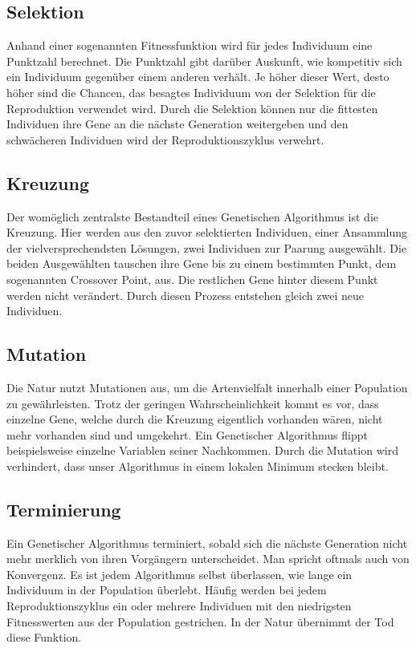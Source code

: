 \subsection{Selektion}
Anhand einer sogenannten Fitnessfunktion wird für jedes Individuum eine Punktzahl berechnet.
Die Punktzahl gibt darüber Auskunft, wie kompetitiv sich ein Individuum gegenüber einem anderen
verhält. Je höher dieser Wert, desto höher sind die Chancen, das besagtes Individuum von der
Selektion für die Reproduktion verwendet wird. Durch die Selektion können nur die fittesten
Individuen ihre Gene an die nächste Generation weitergeben und den schwächeren Individuen wird
der Reproduktionszyklus verwehrt.

\subsection{Kreuzung}
Der womöglich zentralste Bestandteil eines Genetischen Algorithmus ist die Kreuzung. Hier werden
aus den zuvor selektierten Individuen, einer Ansammlung der vielversprechendsten Lösungen, zwei
Individuen zur Paarung ausgewählt. Die beiden Ausgewählten tauschen ihre Gene bis zu einem bestimmten
Punkt, dem sogenannten Crossover Point, aus. Die restlichen Gene hinter diesem Punkt werden nicht
verändert. Durch diesen Prozess entstehen gleich zwei neue Individuen.

\subsection{Mutation}
Die Natur nutzt Mutationen aus, um die Artenvielfalt innerhalb einer Population zu gewährleisten.
Trotz der geringen Wahrscheinlichkeit kommt es vor, dass einzelne Gene, welche durch die Kreuzung
eigentlich vorhanden wären, nicht mehr vorhanden sind und umgekehrt. Ein Genetischer Algorithmus
flippt beispielsweise einzelne Variablen seiner Nachkommen. Durch die Mutation wird verhindert,
dass unser Algorithmus in einem lokalen Minimum stecken bleibt.

\subsection{Terminierung}
Ein Genetischer Algorithmus terminiert, sobald sich die nächste Generation nicht mehr merklich von
ihren Vorgängern unterscheidet. Man spricht oftmals auch von Konvergenz. Es ist jedem Algorithmus
selbst überlassen, wie lange ein Individuum in der Population überlebt. Häufig werden bei jedem
Reproduktionszyklus ein oder mehrere Individuen mit den niedrigsten Fitnesswerten aus der Population
gestrichen. In der Natur übernimmt der Tod diese Funktion.

